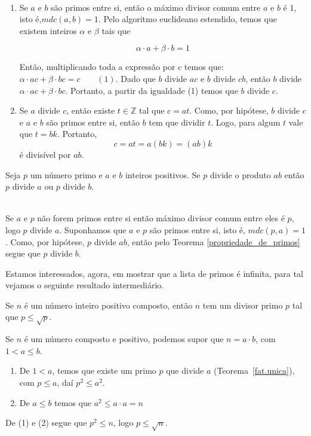 \\
\begin{enumerate}
\item Se $a$ e $b$ s\~ao primos entre si, ent\~ao o m\'aximo divisor comum entre $a$ e $b$ \'e 1, isto \'e,$mdc(a,b)=1$. Pelo algoritmo euclideano estendido, temos que existem inteiros $\alpha$ e $\beta$ tais que 

$$\alpha\cdot a+\beta\cdot b=1$$

Ent\~ao, multiplicando toda a express\~ao por $c$ temos que: $\alpha\cdot ac+\beta\cdot bc=c\quad\quad (1)$. Dado que $b$ divide $ac$ e $b$ divide $cb$, ent\~ao $b$ divide $\alpha\cdot ac+\beta\cdot bc$. Portanto, a partir da igualdade (1) temos que $b$ divide $c$.

\item Se $a$ divide $c$, ent\~ao existe $t\in \mathbb{Z}$ tal que $c=at$. Como, por hip\'otese, $b$ divide $c$ e $a$ e $b$ s\~ao primos entre si, ent\~ao $b$ tem que dividir $t$. Logo, para algum $t$ vale que $t=bk$. Portanto, 
$$c=at=a(bk)=(ab)k$$
\'e divis\'ivel por $ab$.  	
\end{enumerate}	
\hfill\newline

\begin{Th}\label{fundprimos}
Seja $p$ um n\'umero primo e $a$ e $b$ inteiros positivos. 
Se $p$ divide o produto $ab$ ent\~ao $p$ divide $a$ ou $p$ divide $b$. 
\end{Th}

\\
Se $a$ e $p$ n\~ao forem primos entre si ent\~ao m\'aximo divisor comum entre eles \'e $p$, logo $p$ divide $a$. Suponhamos que $a$ e $p$ s\~ao primos entre si, isto \'e, $mdc(p,a)=1$. Como, por hip\'otese, $p$ divide $a\dot b$, ent\~ao pelo Teorema \ref{propriedade_de_primos} segue que $p$ divide $b$.
\hfill\newline

Estamos interessados, agora, em mostrar que a lista de primos \'e infinita, para tal vejamos o seguinte resultado intermedi\'ario.

\begin{Th}\label{divisor_primo}
Se $n$ \'e um n\'umero inteiro positivo composto, ent\~ao $n$ tem um divisor primo
$p$ tal que $p\leq\sqrt{p}$.
\end{Th}

\newline
Se $n$ \'e um n\'umero composto e positivo, podemos supor que $n=a\cdot b$, com $1<a\leq b$.
\begin{enumerate}
\item De $1<a$, temos que existe um primo $p$ que divide $a$ (Teorema~\ref{fat.unica}), com $p\leq a$, da\'i $p^2\leq a^2$.
\item De $a\leq b$ temos que $a^2\leq a\cdot a=n$
\end{enumerate}
De (1) e (2) segue que $p^2\leq n$, logo $p\leq\sqrt{n}$.
\hfill \newline


